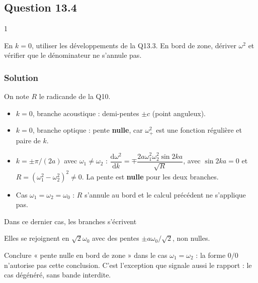 \documentclass[11pt,a4paper]{article}
\providecommand{\tightlist}{\setlength{\itemsep}{0pt}\setlength{\parskip}{0pt}}
\newcommand{\equationajustee}[1]{%
  \sbox{\boiteequation}{$\displaystyle #1$}%
  \ifdim\wd\boiteequation>\linewidth
    \[\resizebox{\linewidth}{!}{\usebox{\boiteequation}}\]%
  \else
    \[#1\]%
  \fi}
\begin{document}
\hypertarget{question-13.4}{%
\subsection{Question 13.4}\label{question-13.4}}

\begin{indication}{1}

En \(k=0\), utiliser les développements de la Q13.3. En bord de zone, dériver \(\omega^2\) et vérifier que le dénominateur ne s'annule pas.

\end{indication}

\hypertarget{solution-19}{%
\subsubsection{Solution}\label{solution-19}}

On note \(R\) le radicande de la Q10.

\begin{itemize}
\tightlist
\item
  \(k=0\), branche acoustique : demi-pentes \(\pm c\) (point anguleux).
\item
  \(k=0\), branche optique : pente \textbf{nulle}, car \(\omega_+^2\) est une fonction régulière et paire de \(k\).
\item
  \(k=\pm\pi/(2a)\) avec \(\omega_1\neq\omega_2\) : \(\dfrac{\mathrm d\omega^2}{\mathrm dk}=\mp\dfrac{2a\omega_1^2\omega_2^2\sin2ka}{\sqrt R}\), avec \(\sin2ka=0\) et \(R=(\omega_1^2-\omega_2^2)^2\neq0\). La pente est \textbf{nulle} pour les deux branches.
\item
  Cas \(\omega_1=\omega_2=\omega_0\) : \(R\) s'annule au bord et le calcul précédent ne s'applique pas.
\end{itemize}

Dans ce dernier cas, les branches s'écrivent

\equationajustee{\begin{aligned}
\omega_-&=2\omega_0\lvert\sin(ka/2)\rvert\\
\omega_+&=2\omega_0\cos(ka/2)
\end{aligned}}

Elles se rejoignent en \(\sqrt2\omega_0\) avec des pentes \(\pm a\omega_0/\sqrt2\), non nulles.

\begin{piege}

Conclure « pente nulle en bord de zone » dans le cas \(\omega_1=\omega_2\) : la forme \(0/0\) n'autorise pas cette conclusion. C'est l'exception que signale aussi le rapport : le cas dégénéré, sans bande interdite.

\end{piege}
\end{document}

